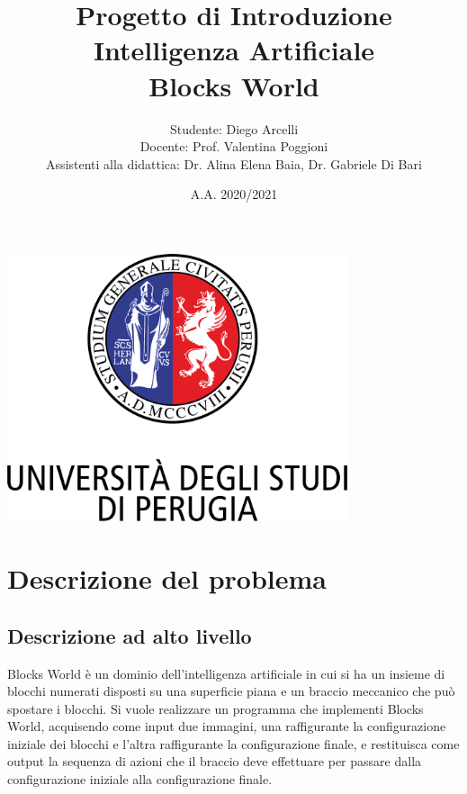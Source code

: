 \documentclass{article}
\begin{document}
	
	\begin{titlepage}
		
		\title{Progetto di Introduzione Intelligenza Artificiale\\Blocks World}
		\author{Studente: Diego Arcelli\\Docente: Prof. Valentina Poggioni\\Assistenti alla didattica: Dr. Alina Elena Baia, Dr. Gabriele Di Bari}
		\date{A.A. 2020/2021}
		\maketitle
		\centering
		\includegraphics[width=10cm]{./images/logo_unipg.png}\hspace{-1cm}
		
	\end{titlepage}
	
	\tableofcontents
	\newpage
	
	\section{Descrizione del problema}
	\subsection{Descrizione ad alto livello}
	Blocks World è un dominio dell'intelligenza artificiale in cui si ha un insieme di blocchi numerati disposti su una superficie piana e un braccio meccanico che può spostare i blocchi. Si vuole realizzare un programma che implementi Blocks World, acquisendo come input due immagini, una raffigurante la configurazione iniziale dei blocchi e l'altra raffigurante la configurazione finale, e restituisca come output la sequenza di azioni che il braccio deve effettuare per passare dalla configurazione iniziale alla configurazione finale.
	
\end{document}
